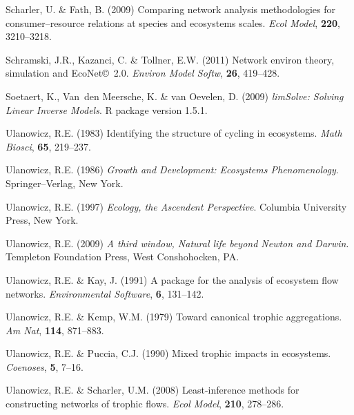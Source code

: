 \documentclass[11pt]{article}
\begin{document}
\begin{thebibliography}{79}
Scharler, U. \& Fath, B. (2009) Comparing network analysis methodologies for
  consumer--resource relations at species and ecosystems scales.
\newblock \emph{Ecol Model}, \textbf{220}, 3210--3218.

Schramski, J.R., Kazanci, C. \& Tollner, E.W. (2011) Network environ theory,
  simulation and {EcoNet}\copyright\ 2.0.
\newblock \emph{Environ Model Softw}, \textbf{26}, 419--428.

Soetaert, K., Van~den Meersche, K. \& van Oevelen, D. (2009) \emph{limSolve:
  Solving Linear Inverse Models}.
\newblock R package version 1.5.1.

Ulanowicz, R.E. (1983) Identifying the structure of cycling in ecosystems.
\newblock \emph{Math Biosci}, \textbf{65}, 219--237.

Ulanowicz, R.E. (1986) \emph{Growth and Development: Ecosystems Phenomenology}.
\newblock Springer--Verlag, New York.

Ulanowicz, R.E. (1997) \emph{Ecology, the Ascendent Perspective}.
\newblock Columbia University Press, New York.

Ulanowicz, R.E. (2009) \emph{A third window, {N}atural life beyond {N}ewton and
  {D}arwin}.
\newblock Templeton Foundation Press, West Conshohocken, PA.

Ulanowicz, R.E. \& Kay, J. (1991) A package for the analysis of ecosystem flow
  networks.
\newblock \emph{Environmental Software}, \textbf{6}, 131--142.

Ulanowicz, R.E. \& Kemp, W.M. (1979) Toward canonical trophic aggregations.
\newblock \emph{Am Nat}, \textbf{114}, 871--883.

Ulanowicz, R.E. \& Puccia, C.J. (1990) Mixed trophic impacts in ecosystems.
\newblock \emph{Coenoses}, \textbf{5}, 7--16.

Ulanowicz, R.E. \& Scharler, U.M. (2008) Least-inference methods for
  constructing networks of trophic flows.
\newblock \emph{Ecol Model}, \textbf{210}, 278--286.


\end{thebibliography}
\end{document}
